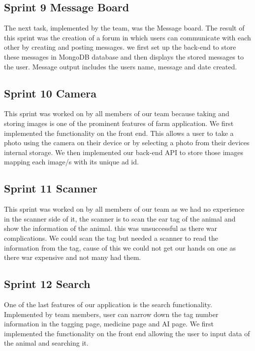 \documentclass[12pt,a4paper,oneside,openany]{book}
\begin{document}
\subsection{Sprint 9 Message Board }
The next task, implemented by the team, was the Message board. The result of this sprint was the creation of a forum in which users can communicate with each other by creating and posting messages. we first set up the back-end to store these messages in MongoDB database and then displays the stored messages to the user. Message output includes the users name, message and date created.

\subsection{Sprint 10 Camera}
This sprint was worked on by all members of our team because taking and storing images is one of the prominent features of farm application. We first implemented the functionality on the front end. This allows a user to take a photo using the camera on their device or by selecting a photo from their devices internal storage. We then implemented our back-end API to store those images mapping each image/s with its unique ad id.

\subsection{Sprint 11 Scanner}
This sprint was worked on by all members of our team as we had no experience in the scanner side of it, the scanner is to scan the ear tag of the animal and show the information of the animal. this was unsuccessful as there war complications. We could scan the tag but needed a scanner to read the information from the tag, cause of this we could not get our hands on one as there war expensive and not many had them.

\subsection{Sprint 12 Search}
One of the last features of our application is the search functionality. Implemented by team members, user can narrow down the tag number information in the tagging page, medicine page and AI page. We first implemented the functionality on the front end allowing the user to input data of the animal and searching it.


\end{document}
